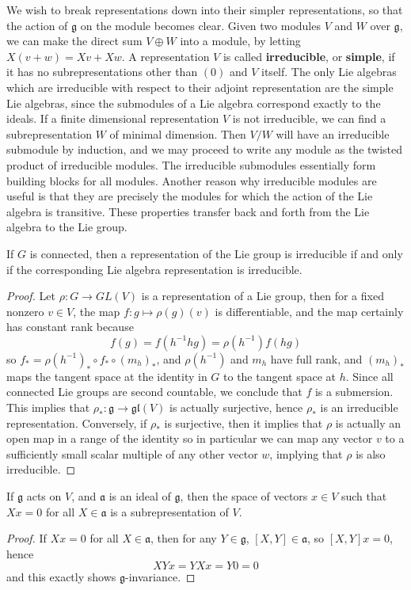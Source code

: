 We wish to break representations down into their simpler representations, so that the action of $\mathfrak{g}$ on the module becomes clear. Given two modules $V$ and $W$ over $\mathfrak{g}$, we can make the direct sum $V \oplus W$ into a module, by letting $X(v + w) = Xv + Xw$. A representation $V$ is called {\bf irreducible}, or {\bf simple}, if it has no subrepresentations other than $(0)$ and $V$ itself. The only Lie algebras which are irreducible with respect to their adjoint representation are the simple Lie algebras, since the submodules of a Lie algebra correspond exactly to the ideals. If a finite dimensional representation $V$ is not irreducible, we can find a subrepresentation $W$ of minimal dimension. Then $V/W$ will have an irreducible submodule by induction, and we may proceed to write any module as the twisted product of irreducible modules. The irreducible submodules essentially form building blocks for all modules. Another reason why irreducible modules are useful is that they are precisely the modules for which the action of the Lie algebra is transitive. These properties transfer back and forth from the Lie algebra to the Lie group.

\begin{lemma}
    If $G$ is connected, then a representation of the Lie group is irreducible if and only if the corresponding Lie algebra representation is irreducible.
\end{lemma}
\begin{proof}
    Let $\rho: G \to GL(V)$ is a representation of a Lie group, then for a fixed nonzero $v \in V$, the map $f: g \mapsto \rho(g)(v)$ is differentiable, and the map certainly has constant rank because
    \[ f(g) = f(h^{-1}hg) = \rho(h^{-1})f(hg) \]
    so $f_* = \rho(h^{-1})_* \circ f_* \circ (m_h)_*$, and $\rho(h^{-1})$ and $m_h$ have full rank, and $(m_h)_*$ maps the tangent space at the identity in $G$ to the tangent space at $h$. Since all connected Lie groups are second countable, we conclude that $f$ is a submersion. This implies that $\rho_*: \mathfrak{g} \to \mathfrak{gl}(V)$ is actually surjective, hence $\rho_*$ is an irreducible representation. Conversely, if $\rho_*$ is surjective, then it implies that $\rho$ is actually an open map in a range of the identity so in particular we can map any vector $v$ to a sufficiently small scalar multiple of any other vector $w$, implying that $\rho$ is also irreducible.
\end{proof}

\begin{lemma}
    If $\mathfrak{g}$ acts on $V$, and $\mathfrak{a}$ is an ideal of $\mathfrak{g}$, then the space of vectors $x \in V$ such that $Xx = 0$ for all $X \in \mathfrak{a}$ is a subrepresentation of $V$.
\end{lemma}
\begin{proof}
    If $Xx = 0$ for all $X \in \mathfrak{a}$, then for any $Y \in \mathfrak{g}$, $[X,Y] \in \mathfrak{a}$, so $[X,Y]x = 0$, hence
    \[ XYx = YXx = Y0 = 0 \]
    and this exactly shows $\mathfrak{g}$-invariance.
\end{proof}

